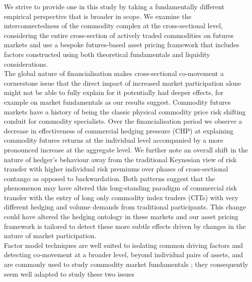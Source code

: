\documentclass[
  authoryear,
  preprint,
  3p]{elsarticle}
\begin{document}
We strive to provide one in this study by taking a fundamentally
different empirical perspective that is broader in scope. We examine the
interconnectedness of the commodity complex at the cross-sectional
level, considering the entire cross-section of actively traded
commodities on futures markets and use a bespoke futures-based asset
pricing framework that includes factors constructed using both
theoretical fundamentals and liquidity considerations.\\
The global nature of financialisation makes cross-sectional co-movement
a cornerstone issue that the direct impact of increased market
participation alone might not be able to fully explain for it
potentially had deeper effects, for example on market fundamentals as
our results suggest. Commodity futures markets have a history of being
the classic physical commodity price risk shifting conduit for commodity
specialists. Over the financialisation period we observe a decrease in
effectiveness of commercial hedging pressure (CHP) at explaining
commodity futures returns at the individual level accompanied by a more
pronounced increase at the aggregate level. We further note an overall
shift in the nature of hedger's behaviour away from the traditional
Keynesian view of risk transfer with higher individual risk premiums
over phases of cross-sectional contango as opposed to backwardation.
Both patterns suggest that the phenomenon may have altered this
long-standing paradigm of commercial risk transfer with the entry of
long only commodity index traders (CITs) with very different hedging and
volume demands from traditional participants. This change could have
altered the hedging ontology in these markets and our asset pricing
framework is tailored to detect these more subtle effects driven by
changes in the nature of market participation.\\
Factor model techniques are well suited to isolating common driving
factors and detecting co-movement
\citep{fama_common_1993, carhart_persistence_1997, asness_devil_2013, fama_five_factor_2015, hou_digesting_2015, asness_fact_2015, frazzini_betting_2014, asness_quality_2019}
at a broader level, beyond individual pairs of assets, and are commonly
used to study commodity market fundamentals
\citep{schwartz_short_2000, miffre_momentum_2007, gorton_fundamentals_2012, cortazar_commodity_2013, yang_investment_2013, daskalaki_factors_2014, szymanowska_anatomy_2014, fernandez_skewness_2018, bakshi_understanding_2019, boons_basis_2019, sakkas_factor_2020};
they consequently seem well adapted to study these two issues
\end{document}
